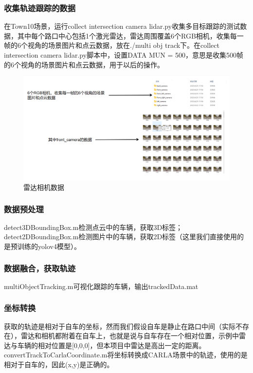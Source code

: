 \subsubsection{收集轨迹跟踪的数据}
在Town10场景，运行collect intersection camera lidar.py收集多目标跟踪的测试数据，其中每个路口中心包括1个激光雷达，雷达周围覆盖6个RGB相机，收集每一帧的6个视角的场景图片和点云数据，放在./multi obj track下。在collect intersection camera lidar.py脚本中，设置DATA MUN = 500，意思是收集500帧的6个视角的场景图片和点云数据，用于以后的操作。



\begin{figure}[htbp] %
	\centering
	\includegraphics[width=1\textwidth]{p12} %
	\caption{雷达相机数据} %
	\label{fig:p12} %
\end{figure}



\subsubsection{数据预处理}
detect3DBoundingBox.m检测点云中的车辆，获取3D标签；
detect2DBoundingBox.m检测图片中的车辆，获取2D标签（这里我们直接使用的是预训练的yolov4模型）。
\subsubsection{数据融合，获取轨迹}
multiObjectTracking.m可视化跟踪的车辆，输出trackedData.mat
\subsubsection{坐标转换}
获取的轨迹是相对于自车的坐标，然而我们假设自车是静止在路口中间（实际不存在），雷达和相机都附着在自车上，也就是说与自车存在一个相对位置，示例中雷达与车辆的相对位置是[0,0,0]，但本项目中雷达是高出一定的距离。convertTrackToCarlaCoordinate.m将坐标转换成CARLA场景中的轨迹，使用的是相对于自车的，因此(x,y)是正确的。


